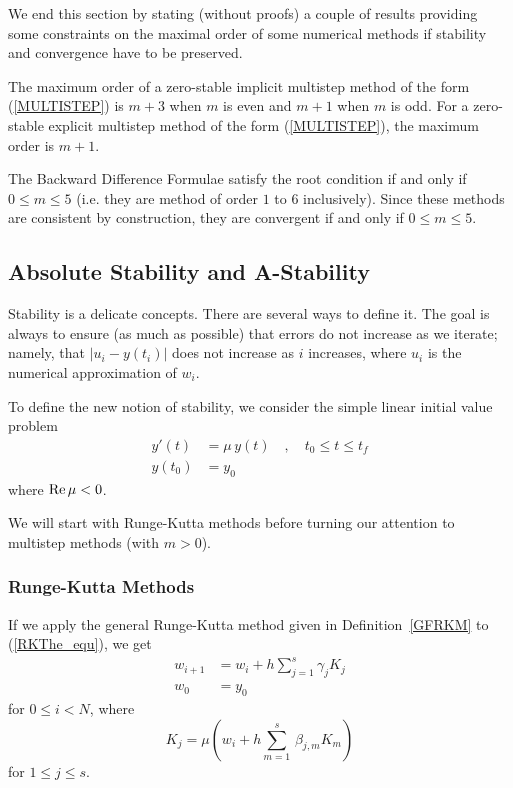 We end this section by stating (without proofs) a couple of results
providing some constraints on the maximal order of some
numerical methods if stability and convergence have to be preserved.

\begin{theorem}
The maximum order of a zero-stable implicit multistep method
of the form (\ref{MULTISTEP}) is $m+3$ when $m$ is even and $m+1$ when $m$
is odd.  For a zero-stable explicit multistep method of the form
(\ref{MULTISTEP}), the maximum order is $m+1$.
\end{theorem}

\begin{prop}
The Backward Difference Formulae satisfy the root condition
if and only if $0\leq m \leq 5$ (i.e. they are method of order $1$ to
$6$ inclusively).  Since these methods are consistent by
construction, they are convergent if and only if $0\leq m \leq 5$. 
\end{prop}

\subsection{Absolute Stability and A-Stability}

Stability is a delicate concepts.  There are several ways to define
it.  The goal is always to ensure (as much as possible) that errors do not
increase as we iterate; namely, that $|u_i - y(t_i)|$ does not increase as
$i$ increases, where $u_i$ is the numerical approximation of $w_i$.

To define the new notion of stability, we consider the simple linear
initial value problem
\begin{equation} \label{RKThe_equ}
\begin{split}
y'(t) & = \mu\, y(t) \quad , \quad t_0 \leq t \leq t_f \\
y(t_0) & = y_0
\end{split}
\end{equation}
where $\operatorname{Re} \mu < 0$.

We will start with Runge-Kutta methods before turning our attention to
multistep methods (with $m>0$).

\subsubsection{Runge-Kutta Methods}

If we apply the general Runge-Kutta method given
in Definition~\ref{GFRKM} to (\ref{RKThe_equ}), we get
\begin{align*}
w_{i+1} &= w_i + h \sum_{j=1}^s \gamma_j K_j \\
w_0 &= y_0
\end{align*}
for $0 \leq i < N$, where
\[
K_j = \mu \left( w_i + h \sum_{m=1}^s\,\beta_{j,m}K_m \right)
\]
for $1 \leq j \leq s$.

